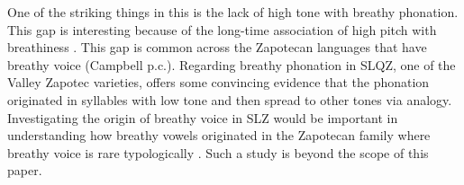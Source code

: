 One of the striking things in this is the lack of high tone with breathy phonation. This gap is interesting because of the long-time association of high pitch with breathiness \citep[for an overview, see][]{eslingVoiceQualityLaryngeal2019}. This gap is common across the Zapotecan languages that have breathy voice (Campbell p.c.). Regarding breathy phonation in SLQZ, one of the Valley Zapotec varieties, \citet{uchiharaToneRegistrogenesisQuiavini2016} offers some convincing evidence that the phonation originated in syllables with low tone and then spread to other tones via analogy. Investigating the origin of breathy voice in SLZ would be important in understanding how breathy vowels originated in the Zapotecan family where breathy voice is rare typologically \citep{ariza-garciaPhonationTypesTones2018}. Such a study is beyond the scope of this paper.  
